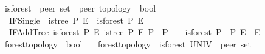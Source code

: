\begin{isabellebody}
{}
\isamarkuptrue%
%
\endisatagdocument
{\isafolddocument}%
%
\isadelimdocument
%
\endisadelimdocument
{}\isamarkupfalse%
\ is{\isacharunderscore}{\kern0pt}forest\ {\isacharcolon}{\kern0pt}{\isacharcolon}{\kern0pt}\ {\isachardoublequoteopen}{\isacharprime}{\kern0pt}peer\ set\ {\isasymRightarrow}\ {\isacharprime}{\kern0pt}peer\ topology\ {\isasymRightarrow}\ bool{\isachardoublequoteclose}\ \isanewline
\ \ IFSingle{\isacharcolon}{\kern0pt}\ \ {\isachardoublequoteopen}is{\isacharunderscore}{\kern0pt}tree\ P\ E\ {\isasymLongrightarrow}\ is{\isacharunderscore}{\kern0pt}forest\ P\ E{\isachardoublequoteclose}\ {\isacharbar}{\kern0pt}\isanewline
\ \ IFAddTree{\isacharcolon}{\kern0pt}\ {\isachardoublequoteopen}{\isasymlbrakk}is{\isacharunderscore}{\kern0pt}forest\ P{}\ E{}{\isacharsemicolon}{\kern0pt}\ is{\isacharunderscore}{\kern0pt}tree\ P{}\ E{}{\isacharsemicolon}{\kern0pt}\ P{}\ {\isasyminter}\ P{}\ {\isacharequal}{\kern0pt}\ {\isacharbraceleft}{\kern0pt}{\isacharbraceright}{\kern0pt}{\isasymrbrakk}\ {\isasymLongrightarrow}\ is{\isacharunderscore}{\kern0pt}forest\ {\isacharparenleft}{\kern0pt}P{}\ {\isasymunion}\ P{}{\isacharparenright}{\kern0pt}\ {\isacharparenleft}{\kern0pt}E{}\ {\isasymunion}\ E{}{\isacharparenright}{\kern0pt}{\isachardoublequoteclose}\isanewline
\isanewline
{}\isamarkupfalse%
\ forest{\isacharunderscore}{\kern0pt}topology\ {\isacharcolon}{\kern0pt}{\isacharcolon}{\kern0pt}\ {\isachardoublequoteopen}bool{\isachardoublequoteclose}\ \isanewline
\ \ {\isachardoublequoteopen}forest{\isacharunderscore}{\kern0pt}topology\ {\isasymequiv}\ is{\isacharunderscore}{\kern0pt}forest\ {\isacharparenleft}{\kern0pt}UNIV\ {\isacharcolon}{\kern0pt}{\isacharcolon}{\kern0pt}\ {\isacharprime}{\kern0pt}peer\ set{\isacharparenright}{\kern0pt}\ {\isacharparenleft}{\kern0pt}{\isasymG}{\isacharparenright}{\kern0pt}{\isachardoublequoteclose}\isanewline
\isanewline
{}\isamarkupfalse%
\isanewline
%
\isadelimtheory
%
\endisadelimtheory
%
\isatagtheory
{}\isamarkupfalse%
%
\endisatagtheory
{\isafoldtheory}%
%
\isadelimtheory
%
\endisadelimtheory
%
\end{isabellebody}%
\endinput
